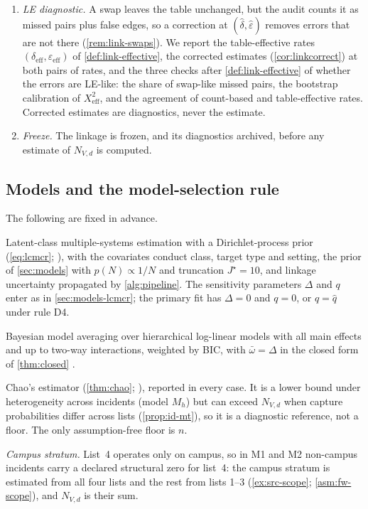 \begin{enumerate}[1.]
  \item \emph{LE diagnostic.} A swap leaves the table unchanged, but the audit counts it as missed pairs plus false edges, so a correction at $(\hat\delta,\hat\varepsilon)$ removes errors that are not there (\cref{rem:link-swaps}). We report the table-effective rates $(\delta_{\mathrm{eff}},\varepsilon_{\mathrm{eff}})$ of \cref{def:link-effective}, the corrected estimates (\cref{cor:linkcorrect}) at both pairs of rates, and the three checks after \cref{def:link-effective} of whether the errors are LE-like: the share of swap-like missed pairs, the bootstrap calibration of $X^2_{\mathrm{eff}}$, and the agreement of count-based and table-effective rates. Corrected estimates are diagnostics, never the estimate.
  \item \emph{Freeze.} The linkage is frozen, and its diagnostics archived, before any estimate of $N_{V,d}$ is computed.
\end{enumerate}

\subsection{Models and the model-selection rule}\label{sec:plan-models}

The following are fixed in advance.
\begin{description}[style=unboxed,leftmargin=0pt]
  \item[M1, primary.] Latent-class multiple-systems estimation with a Dirichlet-process prior (\cref{eq:lcmcr}; \citealp{manriquevallier2016}), with the covariates conduct class, target type and setting, the prior of \cref{sec:models} with $p(N)\propto1/N$ and truncation $J^\star=10$, and linkage uncertainty propagated by \cref{alg:pipeline}. The sensitivity parameters $\Delta$ and $q$ enter as in \cref{sec:models-lcmcr}; the primary fit has $\Delta=0$ and $q=0$, or $q=\hat q$ under rule D4.
  \item[M2, secondary.] Bayesian model averaging over hierarchical log-linear models with all main effects and up to two-way interactions, weighted by BIC, with $\bar\omega=\Delta$ in the closed form of \cref{thm:closed} \citep{fienberg1972,madigan1997}.
  \item[M3, diagnostic.] Chao's estimator (\cref{thm:chao}; \citealp{chao1987}), reported in every case. It is a lower bound under heterogeneity across incidents (model $M_h$) but can exceed $N_{V,d}$ when capture probabilities differ across lists (\cref{prop:id-mt}), so it is a diagnostic reference, not a floor. The only assumption-free floor is $n$.
\end{description}
\emph{Campus stratum.} List~4 operates only on campus, so in M1 and M2 non-campus incidents carry a declared structural zero for list~4: the campus stratum is estimated from all four lists and the rest from lists 1--3 (\cref{ex:src-scope}; \cref{asm:fw-scope}), and $N_{V,d}$ is their sum.

